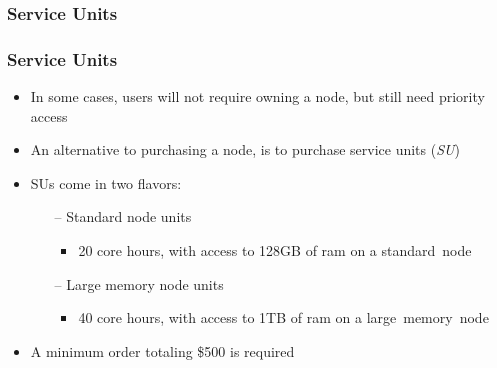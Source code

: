 \documentclass[t,hyperref={pdfpagelabels=false}]{beamer}
\begin{document}
\subsubsection{Service Units}
\begin{frame}	
	\frametitle{Service Units}
	\begin{itemize}
	 \item In some cases, users will not require owning a node, but still need priority access
	 \item An alternative to purchasing a node, is to purchase service units (\emph{SU})
	 \item SUs come in two flavors:
		 \begin{itemize}
			 \item[--] Standard node units 
				\begin{itemize}
					\item 20 core hours, with access to 128GB of ram on a standard~node
				\end{itemize}
			 \item[--] Large memory node units
				\begin{itemize}
					\item 40 core hours, with access to 1TB of ram on a large~memory~node
				\end{itemize}
		 \end{itemize}
	 \item A minimum order totaling \$500 is required
	\end{itemize}
\end{frame}
\end{document}
